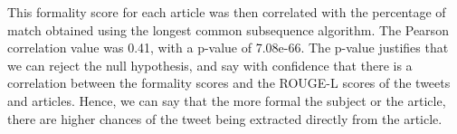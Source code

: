 This formality score for each article was then correlated with the percentage of match obtained using the longest common subsequence algorithm. The Pearson correlation value was 0.41, with a p-value of 7.08e-66. The p-value justifies that we can reject the null hypothesis, and say with confidence that there is a correlation between the formality scores and the ROUGE-L scores of the tweets and articles. Hence, we can say that the more formal the subject or the article, there are higher chances of the tweet being extracted directly from the article. 
